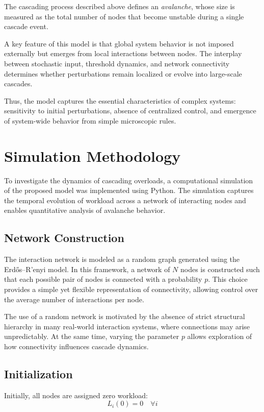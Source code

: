 \documentclass[12pt]{article}
\begin{document}
The cascading process described above defines an \textit{avalanche}, whose size is measured as the total number of nodes that become unstable during a single cascade event.

A key feature of this model is that global system behavior is not imposed externally but emerges from local interactions between nodes. The interplay between stochastic input, threshold dynamics, and network connectivity determines whether perturbations remain localized or evolve into large-scale cascades.

Thus, the model captures the essential characteristics of complex systems: sensitivity to initial perturbations, absence of centralized control, and emergence of system-wide behavior from simple microscopic rules.

\section{Simulation Methodology}

To investigate the dynamics of cascading overloads, a computational simulation of the proposed model was implemented using Python. The simulation captures the temporal evolution of workload across a network of interacting nodes and enables quantitative analysis of avalanche behavior.

\subsection{Network Construction}

The interaction network is modeled as a random graph generated using the Erd\H{o}s–R'enyi model. In this framework, a network of $N$ nodes is constructed such that each possible pair of nodes is connected with a probability $p$. This choice provides a simple yet flexible representation of connectivity, allowing control over the average number of interactions per node.

The use of a random network is motivated by the absence of strict structural hierarchy in many real-world interaction systems, where connections may arise unpredictably. At the same time, varying the parameter $p$ allows exploration of how connectivity influences cascade dynamics.

\subsection{Initialization}

Initially, all nodes are assigned zero workload:
\[
L_i(0) = 0 \quad \forall i
\]
\end{document}
